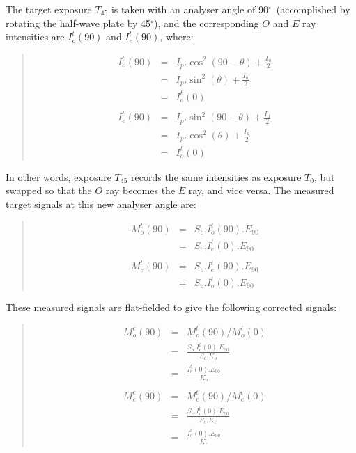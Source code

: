 \documentclass[twoside,11pt]{starlink}
\newenvironment{myquote}{\begin{quote}\begin{small}}{\end{small}\end{quote}}
\providecommand{\dgs}{\hbox{$^\circ$}}
\begin{document}
The target exposure $T_{45}$ is taken with an analyser angle of 90\dgs\
(accomplished by rotating the half-wave plate by 45\dgs), and the
corresponding $O$ and $E$ ray intensities are $I^{t}_{o}(90)$ and
$I^{t}_{e}(90)$, where:

\begin{myquote}
\begin{eqnarray*}
  I^{t}_{o}(90) & = & I_{p}.\cos^{2}( 90 - \theta ) + \frac{I_{u}}{2} \\
                 & = & I_{p}.\sin^{2}( \theta ) + \frac{I_{u}}{2} \\
                 & = & I^{t}_{e}(0) \\ \\
  I^{t}_{e}(90) & = & I_{p}.\sin^{2}( 90 - \theta ) + \frac{I_{u}}{2} \\
                 & = & I_{p}.\cos^{2}( \theta ) + \frac{I_{u}}{2} \\
                 & = & I^{t}_{o}(0)
\end{eqnarray*}
\end{myquote}

In other words, exposure $T_{45}$ records the same intensities as
exposure $T_{0}$, but swapped so that the $O$ ray becomes the
$E$ ray, and vice versa. The measured target signals at this new
analyser angle are:

\begin{myquote}
\begin{eqnarray*}
  M^{t}_{o}(90) & = & S_{o}.I^{t}_{o}(90).E_{90} \\
                & = & S_{o}.I^{t}_{e}(0).E_{90} \\ \\
  M^{t}_{e}(90) & = & S_{e}.I^{t}_{e}(90).E_{90} \\
                & = & S_{e}.I^{t}_{o}(0).E_{90}
\end{eqnarray*}
\end{myquote}

These measured signals are flat-fielded to give the following corrected
signals:

\begin{myquote}
\begin{eqnarray*}
  M^{c}_{o}(90) & = & M^{t}_{o}(90) / M^{l}_{o}(0) \\
                & = & \frac{ S_{o}.I^{t}_{e}(0).E_{90} }{ S_{o}.K_{o} } \\
                & = & \frac{ I^{t}_{e}(0).E_{90} }{ K_{o} } \\ \\
  M^{c}_{e}(90) & = & M^{t}_{e}(90) / M^{l}_{e}(0) \\
                & = & \frac{ S_{e}.I^{t}_{o}(0).E_{90} }{ S_{e}.K_{e} } \\
                & = & \frac{ I^{t}_{o}(0).E_{90} }{ K_{e} }
\end{eqnarray*}
\end{myquote}
\end{document}
